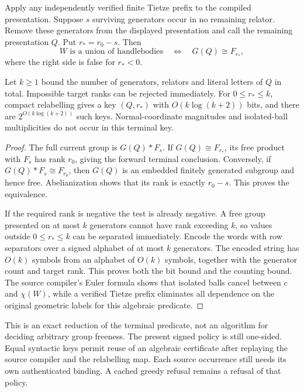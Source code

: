 \begin{proposition}
\label{prop:terminal-key}
Apply any independently verified finite Tietze prefix to the compiled
presentation.  Suppose $s$ surviving generators occur in no remaining
relator.  Remove these generators from the displayed presentation and
call the remaining presentation $Q$.  Put $r_*=r_0-s$.  Then
\begin{equation}
 W\text{ is a union of handlebodies}\quad\Longleftrightarrow\quad
 G(Q)\cong F_{r_*},
 \label{eq:residual-terminal}
\end{equation}
where the right side is false for $r_*<0$.

Let $k\geq1$ bound the number of generators, relators and literal letters
of $Q$ in total.  Impossible target ranks can be rejected immediately.
For $0\leq r_*\leq k$, compact relabelling gives a key $(Q,r_*)$ with
$O(k\log(k+2))$ bits, and there are
$2^{O(k\log(k+2))}$ such keys.  Normal-coordinate magnitudes and
isolated-ball multiplicities do not occur in this terminal key.
\end{proposition}
\begin{proof}
The full current group is $G(Q)*F_s$.  If $G(Q)\cong F_{r_*}$, its
free product with $F_s$ has rank $r_0$, giving the forward terminal
conclusion.  Conversely, if $G(Q)*F_s\cong F_{r_0}$, then $G(Q)$ is an
embedded finitely generated subgroup and hence free.  Abelianization
shows that its rank is exactly $r_0-s$.  This proves the equivalence.

If the required rank is negative the test is already negative.  A free
group presented on at most $k$ generators cannot have rank exceeding
$k$, so values outside $0\leq r_*\leq k$ can be separated immediately.
Encode the words with row separators over a signed alphabet of at most
$k$ generators.  The encoded string has $O(k)$ symbols from an alphabet
of $O(k)$ symbols, together with the generator count and target rank.
This proves both the bit bound and the counting bound.  The source
compiler's Euler formula shows that isolated balls cancel between $c$
and $\chi(W)$, while a verified Tietze prefix eliminates all dependence
on the original geometric labels for this algebraic predicate.
\end{proof}

This is an exact reduction of the terminal predicate, not an algorithm
for deciding arbitrary group freeness.  The present signed policy is
still one-sided.  Equal syntactic keys permit reuse of an algebraic
certificate after replaying the source compiler and the relabelling map.
Each source occurrence still needs its own authenticated binding.  A
cached greedy refusal remains a refusal of that policy.

